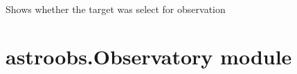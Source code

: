 \documentclass[letterpaper,10pt,english]{sphinxmanual}
\begin{document}
\begin{fulllineitems}
\begin{fulllineitems}
\end{fulllineitems}


\begin{fulllineitems}
\label{astroobs:astroobs.Observation.Observation.ticked}
Shows whether the target was select for observation

\end{fulllineitems}


\end{fulllineitems}



\section{astroobs.Observatory module}
\label{astroobs:astroobs-observatory-module}\label{astroobs:module-astroobs.Observatory}
\end{document}
